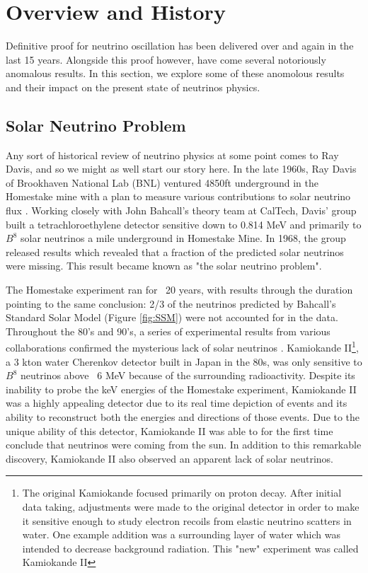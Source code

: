 \documentclass[12pt]{article}
\begin{document}
\clearpage
\section{Overview and History}



Definitive proof for neutrino oscillation has been delivered over and again in the last 15 years. Alongside this proof however, have come several notoriously anomalous results. In this section, we explore some of these anomolous results and their impact on the present state of neutrinos physics. 
\subsection{Solar Neutrino Problem}
Any sort of historical review of neutrino physics at some point comes to Ray Davis, and so we might as well start our story here.  In the late 1960s, Ray Davis of Brookhaven National Lab (BNL) ventured 4850ft underground in the Homestake mine with a plan to measure various contributions to solar neutrino flux \cite{ray0}. Working closely with John Bahcall's theory team at CalTech, Davis' group built a tetrachloroethylene detector sensitive down to 0.814 MeV and primarily to $B^8$ solar neutrinos\cite{ray0} a mile underground in Homestake Mine. In 1968, the group released results which revealed that a fraction of the predicted solar neutrinos were missing. This result became known as "the solar neutrino problem".

\par The Homestake experiment ran for ~20 years, with results through the duration pointing to the same conclusion: 2/3 of the neutrinos predicted by Bahcall's Standard Solar Model (Figure \ref{fig:SSM}) were not accounted for in the data\cite{ray0}.  Throughout the 80's and 90's, a series of experimental results from various collaborations confirmed the mysterious lack of solar neutrinos \cite{rayreview} \cite{kam0} \cite{sno}.  Kamiokande II\footnote{The original Kamiokande focused primarily on proton decay. After initial data taking, adjustments were made to the original detector in order to make it sensitive enough to study electron recoils from elastic neutrino scatters in water. One example addition was a surrounding layer of water which was intended to decrease background radiation.  This "new" experiment was called Kamiokande II}, a 3 kton water Cherenkov detector built in Japan in the 80s, was only sensitive to $B^8$ neutrinos above ~6 MeV\cite{kam0} because of the surrounding radioactivity. Despite its inability to probe the keV energies of the Homestake experiment, Kamiokande II was a highly appealing detector due to its real time depiction of events and its ability to reconstruct both the energies and directions of those events\cite{kam0}. Due to the unique ability of this detector, Kamiokande II was able to for the first time conclude that neutrinos were coming from the sun.  In addition to this remarkable discovery, Kamiokande II also observed an apparent lack of solar neutrinos.
\end{document}
